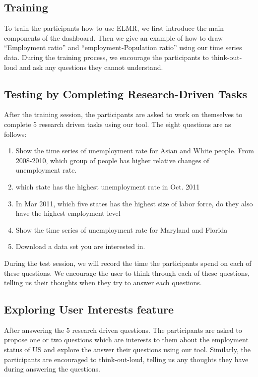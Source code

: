 \documentclass{sigchi}
\begin{document}
\subsection{Training}
To train the participants how to use ELMR, we first introduce the main components of the dashboard. Then we give an example of how to draw ``Employment ratio'' and ``employment-Population ratio'' using our time series data. During the training process, we encourage the participants to think-out-loud and ask any questions they cannot understand.

\subsection{Testing by Completing Research-Driven Tasks}
After the training session, the participants are asked to work on themselves to complete 5 research driven tasks using our tool. The eight questions are as follows:
\begin{enumerate}
\item    Show the time series of unemployment rate for Asian and White people. From 2008-2010, which group of people has higher relative changes of unemployment rate.

\item    which state has the highest unemployment rate in Oct. 2011
\item    In Mar 2011, which five states has the highest size of labor force, do they also have the highest employment level
\item     Show the time series of unemployment rate for Maryland and Florida
\item     Download a data set you are interested in.
\end{enumerate}

During the test session, we will record the time the participants spend on each of these questions. We encourage the user to think through each of these questions, telling us their thoughts when they try to answer each questions.

\subsection{Exploring User Interests feature}
After answering the 5 research driven questions. The participants are asked to propose one or two questions which are interests to them about the employment status of US and explore the answer their questions using our tool. Similarly, the participants are encouraged to think-out-loud, telling us any thoughts they have during answering the questions.
\end{document}
